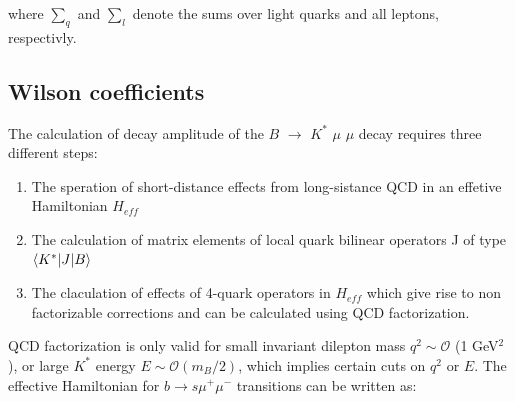 \documentclass[english]{uzhpub}
\begin{document}
where $\sum_q$ and $\sum_l$ denote the sums over light quarks and all leptons, respectivly.




\subsection{Wilson coefficients}
The calculation of decay amplitude of the $B$ $\rightarrow$ $K^{*}$ $\mu$ $\mu$ decay requires three different steps:
\begin{enumerate}
 \item The speration of short-distance effects from long-sistance QCD in an effetive Hamiltonian $H_{eff}$
 \item The calculation of matrix elements of local quark bilinear operators J of type $\braket{ K^* | J | B }$
 \item The claculation of effects of 4-quark operators in $H_{eff}$ which give rise to non factorizable corrections and can be calculated using QCD factorization.
\end{enumerate}
QCD factorization is only valid for small invariant dilepton mass $ q^2 \sim \mathcal{O} $ (1 GeV$^2$),
or large $K^*$ energy $E \sim \mathcal{O}(m_B /2)$,
which implies certain cuts on $q^2$ or $E$. The effective Hamiltonian for $b \rightarrow s \mu^+ \mu^- $ transitions can be written as:
\end{document}

